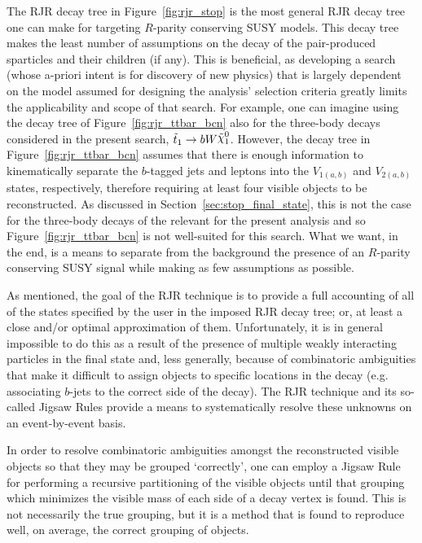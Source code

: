 The RJR decay tree in Figure~\ref{fig:rjr_stop} is the most general RJR decay tree one can make for
targeting $R$-parity conserving SUSY models.
This decay tree makes the least number of assumptions on the decay of the pair-produced sparticles and
their children (if any).
This is beneficial, as developing a search (whose a-priori intent is for discovery of new physics)
that is largely dependent on the model assumed for designing the analysis' selection criteria
greatly limits the applicability and scope of that search.
For example, one can imagine using the decay tree of Figure~\ref{fig:rjr_ttbar_bcn} also for the three-body
decays considered in the present search, $\stopone \rightarrow b W \ninoone$.
However, the decay tree in Figure~\ref{fig:rjr_ttbar_bcn} assumes that there is enough information to
kinematically separate the $b$-tagged jets and leptons into the $V_{1(a,b)}$ and $V_{2(a,b)}$ states,
respectively, therefore requiring at least four visible objects to be reconstructed.
As discussed in Section~\ref{sec:stop_final_state}, this is not the case for the three-body decays
of the \stopone relevant for the present analysis and so Figure~\ref{fig:rjr_ttbar_bcn} is not well-suited
for this search.
What we want, in the end, is a means to separate from the background the presence of an $R$-parity conserving
SUSY signal while making as few assumptions as possible.

As mentioned, the goal of the RJR technique is to provide a full accounting of all of the states specified by the
user in the imposed RJR decay tree; or, at least a close and/or optimal approximation of them.
Unfortunately, it is in general impossible to do this as a result of the presence of multiple weakly interacting
particles in the final state and, less generally, because of combinatoric ambiguities
that make it difficult to assign objects to specific locations in the decay (e.g. associating $b$-jets to
the correct side of the decay).
The RJR technique and its so-called Jigsaw Rules provide a means to systematically resolve these unknowns
on an event-by-event basis.

In order to resolve combinatoric ambiguities amongst the reconstructed visible objects so that they may
be grouped `correctly', one can employ a Jigsaw Rule for performing a recursive partitioning
of the visible objects until that grouping which minimizes the visible mass of each side of a decay vertex is found.
This is not necessarily the true grouping, but it is a method that is found to reproduce well, on average,
the correct grouping of objects.

